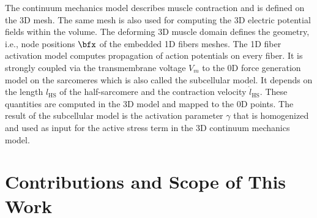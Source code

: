 The continuum mechanics model describes muscle contraction and is defined on the 3D mesh. The same mesh is also used for computing the 3D electric potential fields within the volume. The deforming 3D muscle domain defines the geometry, i.e., node positions $\bfx$ of the embedded 1D fibers meshes. The 1D fiber activation model computes propagation of action potentials on every fiber. It is strongly coupled via the transmembrane voltage $V_m$ to the 0D force generation model on the sarcomeres which is also called the subcellular model. It depends on the length $l_\text{HS}$ of the half-sarcomere and the contraction velocity $\dot{l}_\text{HS}$. These quantities are computed in the 3D model and mapped to the 0D points. The result of the subcellular model is the activation parameter $\gamma$ that is homogenized and used as input for the active stress term in the 3D continuum mechanics model.

\section{Contributions and Scope of This Work}\label{sec:intro_contributions}

